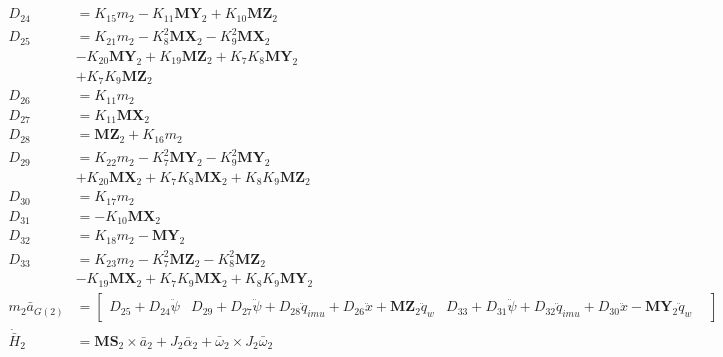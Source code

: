 \begin{align}
 \nonumber \\ 
D_{24} &= K_{15}m_2 - K_{11}\mathbf{MY}_2 + K_{10}\mathbf{MZ}_2 \nonumber \\
D_{25} &= K_{21}m_2 - K_{8}^2\mathbf{MX}_2 - K_{9}^2\mathbf{MX}_2  \nonumber \\
&- K_{20}\mathbf{MY}_2 + K_{19}\mathbf{MZ}_2 + K_{7}K_{8}\mathbf{MY}_2  \nonumber \\
&+ K_{7}K_{9}\mathbf{MZ}_2 \nonumber \\
D_{26} &= K_{11}m_2 \nonumber \\
D_{27} &= K_{11}\mathbf{MX}_2 \nonumber \\
D_{28} &= \mathbf{MZ}_2 + K_{16}m_2 \nonumber \\
D_{29} &= K_{22}m_2 - K_{7}^2\mathbf{MY}_2 - K_{9}^2\mathbf{MY}_2  \nonumber \\
&+ K_{20}\mathbf{MX}_2 + K_{7}K_{8}\mathbf{MX}_2 + K_{8}K_{9}\mathbf{MZ}_2 \nonumber \\
D_{30} &= K_{17}m_2 \nonumber \\
D_{31} &= -K_{10}\mathbf{MX}_2 \nonumber \\
D_{32} &= K_{18}m_2 - \mathbf{MY}_2 \nonumber \\
D_{33} &= K_{23}m_2 - K_{7}^2\mathbf{MZ}_2 - K_{8}^2\mathbf{MZ}_2  \nonumber \\
&- K_{19}\mathbf{MX}_2 + K_{7}K_{9}\mathbf{MX}_2 + K_{8}K_{9}\mathbf{MY}_2 \nonumber \\
 m_{2}\bar{a}_{G(2)} &= \left[\begin{matrix} D_{25} + D_{24}\ddot{\psi} & D_{29} + D_{27}\ddot{\psi} + D_{28}\ddot{q}_{imu} + D_{26}\ddot{x} + \mathbf{MZ}_2\ddot{q}_{w} & D_{33} + D_{31}\ddot{\psi} + D_{32}\ddot{q}_{imu} + D_{30}\ddot{x} - \mathbf{MY}_2\ddot{q}_{w} &  \end{matrix}\right] 
 \nonumber \\ 
 \dot{\bar{H}}_{2} &= \mathbf{MS}_{2} \times \bar{a}_{2} + J_{2}\bar{\alpha}_{2} + \bar\omega_{2} \times J_{2}\bar{\omega}_{2} 
 \nonumber \\ 

\end{align}
